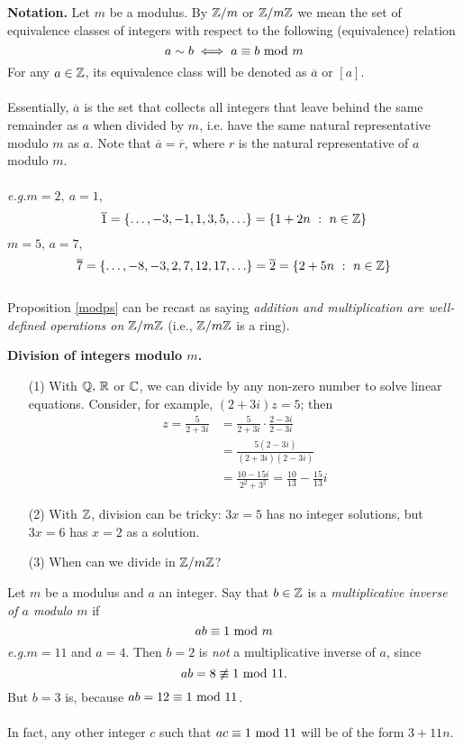 \vspace*{1em}

{\bf Notation.} Let $m$ be a modulus. By $\mathbb Z/m$ or $\mathbb Z/m\mathbb Z$ we mean the set of equivalence classes of integers with respect to the following (equivalence) relation
\[a \sim b \iff a \equiv b \text{ mod }{m}\]
For any $a \in \mathbb Z$, its equivalence class will be denoted as $\overline{a}$ or $[a]$.\\
\\
Essentially, $\overline{a}$ is the set that collects all integers that leave behind the same remainder as $a$ when divided by $m$, i.e. have the same natural representative modulo $m$ as $a$. Note that $\overline{a} = \overline{r}$, where $r$ is the natural representative of $a$ modulo $m$.\\
\\
\emph{e.g.}\quad $m = 2,\ a = 1$, \[\overline{1} = \left\{\ldots,-3,-1,1,3,5,\ldots\right\} = \left\{1 + 2n\ :\ n \in \mathbb Z\right\}\]
$m = 5,\, a = 7$, 
\[\overline{7} = \left\{\ldots,-8,-3,2,7,12,17,\ldots\right\} = \overline{2} = \left\{2 + 5n\ :\ n \in \mathbb Z\right\}\]
\\
Proposition \ref{modps} can be recast as saying \emph{addition and multiplication are well-defined operations on $\mathbb Z/m\mathbb Z$} (i.e., $\mathbb Z/m\mathbb Z$ is a ring).

\vspace*{2.5em}

{\bf Division of integers modulo $m$.}
\begin{itemize}
\item[(1)] With $\mathbb Q,\, \mathbb R$ or $\mathbb C$, we can divide by any non-zero number to solve linear equations. Consider, for example, $(2 + 3i)z = 5$; then
\begin{align*}
z= \frac{5}{2+3i}&= \frac{5}{2+3i}\cdot\frac{2 - 3i}{2 - 3i}\\[0.5em]
&= \frac{5(2 - 3i)}{(2+3i)(2 - 3i)}\\[0.5em]
&= \frac{10 - 15i}{2^2 + 3^2} = \frac{10}{13} - \frac{15}{13}i
\end{align*}
\item[(2)] With $\mathbb Z$, division can be tricky: $3x = 5$ has no integer solutions, but $3x = 6$ has $x = 2$ as a solution.
\item[(3)] When can we divide in $\mathbb Z/m\mathbb Z$?
\end{itemize}

\vspace*{2em}

\begin{definition}
Let $m$ be a modulus and $a$ an integer. Say that $b \in \mathbb Z$ is a \emph{multiplicative inverse of $a$ modulo $m$} if
\[ab \equiv 1\text{ mod }{m}\]
\emph{e.g.}\quad $m = 11$ and $a = 4$. Then $b = 2$ is \emph{not} a multiplicative inverse of $a$, since \[ab = 8 \not\equiv 1 \text{ mod }{11}.\]
But $b = 3$ is, because $ab = 12 \equiv 1 \text{ mod }{11}$.\\
\\
In fact, any other integer $c$ such that $ac \equiv 1\text{ mod }{11}$ will be of the form $3 + 11n$. 
\end{definition}


